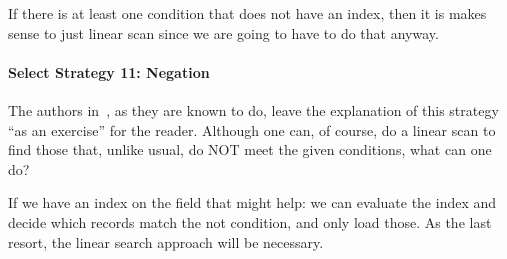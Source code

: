 If there is at least one condition that does not have an index, then it is makes sense to just linear scan since we are going to have to do that anyway.

\paragraph{Select Strategy 11: Negation}
The authors in~\cite{dsc}, as they are known to do, leave the explanation of this strategy ``as an exercise'' for the reader.  Although one can, of course, do a linear scan to find those that, unlike usual, do NOT meet the given conditions, what can one do? 

If we have an index on the field that might help: we can evaluate the index and decide which records match the not condition, and only load those. As the last resort, the linear search approach will be necessary.






